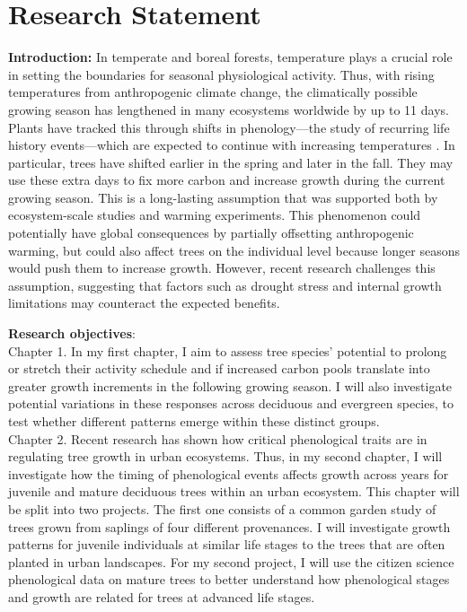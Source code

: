 \documentclass[11pt,letter]{article}
\begin{document}
\section* {Research Statement}
\textbf{Introduction:}
In temperate and boreal forests, temperature plays a crucial role in setting the boundaries for seasonal physiological activity. Thus, with rising temperatures from anthropogenic climate change, the climatically possible growing season has lengthened in many ecosystems worldwide by up to 11 days. \citep{korner_phenology_2010, menzel_growing_1999} Plants have tracked this through shifts in phenology—the study of recurring life history events—which are expected to continue with increasing temperatures \citep{wolkovich_warming_2012}. In particular, trees have shifted earlier in the spring and later in the fall. They may use these extra days to fix more carbon and increase growth during the current growing season. \citep{keenan_net_2014, wang_interactive_2020} This is a long-lasting assumption that was supported both by ecosystem-scale studies and warming experiments. This phenomenon could potentially have global consequences by partially offsetting anthropogenic warming, but could also affect trees on the individual level because longer seasons would push them to increase growth. \citep{grossiord_warming_2022} However, recent research challenges this assumption, suggesting that factors such as drought stress and internal growth limitations may counteract the expected benefits. \citep{dow_warm_2022, green_limits_2022}  %
\par
\textbf{Research objectives}: \\
Chapter 1. In my first chapter, I aim to assess tree species’ potential to prolong or stretch their activity schedule and if increased carbon pools translate into greater growth increments in the following growing season. I will also investigate potential variations in these responses across deciduous and evergreen species, to test whether different patterns emerge within these distinct groups.\\
Chapter 2. Recent research has shown how critical phenological traits are in regulating tree growth in urban ecosystems. \citep{simovic_functional_2024} Thus, in my second chapter, I will investigate how the timing of phenological events affects growth across years for juvenile and mature deciduous trees within an urban ecosystem. This chapter will be split into two projects. The first one consists of a common garden study of trees grown from saplings of four different provenances. I will investigate growth patterns for juvenile individuals at similar life stages to the trees that are often planted in urban landscapes. For my second project, I will use the citizen science phenological data on mature trees to better understand how phenological stages and growth are related for trees at advanced life stages.
\end{document}
